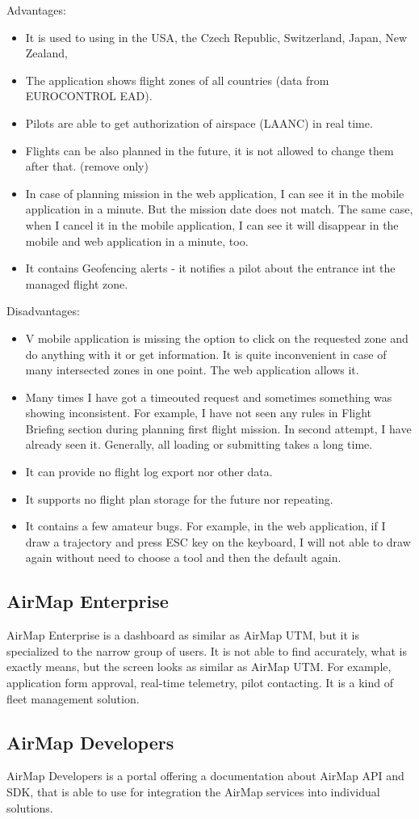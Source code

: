 Advantages:
\begin{itemize}
    \item It is used to using in the USA, the Czech Republic, Switzerland, Japan, New Zealand, \textellipsis
    \item The application shows flight zones of all countries (data from EUROCONTROL EAD).\cite{eurocontrol}
    \item Pilots are able to get authorization of airspace (LAANC) in real time.
    \item Flights can be also planned in the future, it is not allowed to change them after that. (remove only)
    \item In case of planning mission in the web application, I can see it in the mobile application in a minute.
    But the mission date does not match.
    The same case, when I cancel it in the mobile application, I can see it will disappear in the mobile and web application in a minute, too.
    \item It contains Geofencing alerts - it notifies a pilot about the entrance int the managed flight zone.
\end{itemize}
Disadvantages:
\begin{itemize}
    \item V mobile application is missing the option to click on the requested zone and do anything with it or get information.
    It is quite inconvenient in case of many intersected zones in one point.
    The web application allows it.
    \item Many times I have got a timeouted request and sometimes something was showing inconsistent.
    For example, I have not seen any rules in Flight Briefing section during planning first flight mission.
    In second attempt, I have already seen it.
    Generally, all loading or submitting takes a long time.
    \item It can provide no flight log export nor other data.
    \item It supports no flight plan storage for the future nor repeating.
    \item It contains a few amateur bugs.
    For example, in the web application, if I draw a trajectory and press ESC key on the keyboard, I will not able to draw again without need to choose a tool and then the default again.
\end{itemize}


\subsection{AirMap Enterprise}\label{subsec:airmap-enterprise}
AirMap Enterprise is a dashboard as similar as AirMap UTM, but it is specialized to the narrow group of users.
It is not able to find accurately, what is exactly means, but the screen looks as similar as AirMap UTM. For example, application form approval, real-time telemetry, pilot contacting.
It is a kind of fleet management solution.


\subsection{AirMap Developers}\label{subsec:airmap-developers}
AirMap Developers is a portal offering a documentation about AirMap API and SDK, that is able to use for integration the AirMap services into individual solutions.\cite{airMapDevelopers}
